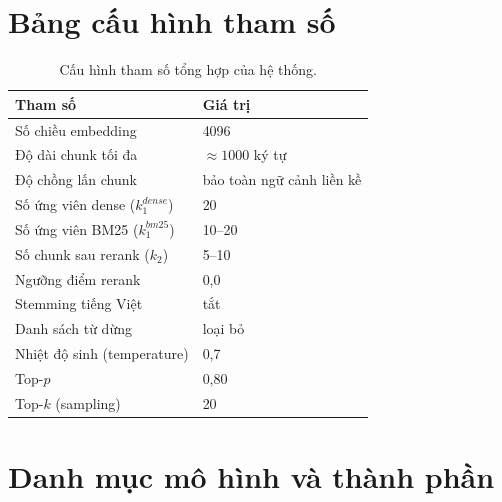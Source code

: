 \chapter{Bảng cấu hình tham số}
\label{app:config}

\begin{table}[htbp]
\centering
\caption{Cấu hình tham số tổng hợp của hệ thống.}
\label{tab:app-config}
\small
\begin{tabular}{@{}p{6.4cm}p{8cm}@{}}
\toprule
\textbf{Tham số} & \textbf{Giá trị} \\
\midrule
Số chiều embedding & 4096 \\
Độ dài chunk tối đa & $\approx 1000$ ký tự \\
Độ chồng lấn chunk & bảo toàn ngữ cảnh liền kề \\
Số ứng viên dense ($k_1^{dense}$) & 20 \\
Số ứng viên BM25 ($k_1^{bm25}$) & 10--20 \\
Số chunk sau rerank ($k_2$) & 5--10 \\
Ngưỡng điểm rerank & 0,0 \\
Stemming tiếng Việt & tắt \\
Danh sách từ dừng & loại bỏ \\
Nhiệt độ sinh (temperature) & 0,7 \\
Top-$p$ & 0,80 \\
Top-$k$ (sampling) & 20 \\
\bottomrule
\end{tabular}
\end{table}

\chapter{Danh mục mô hình và thành phần}
\label{app:models}

